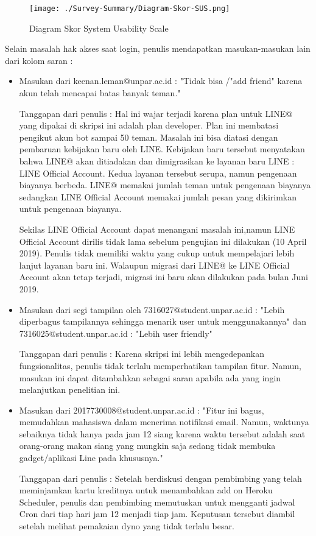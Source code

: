 \begin{figure}[H]
	\centering  
	\texttt{[image: ./Survey-Summary/Diagram-Skor-SUS.png]}
	\caption[Diagram Skor System Usability Scale]{Diagram Skor System Usability Scale} 
	\label{fig:summary-Diagram-Skor-SUS} 
\end{figure}

Selain masalah hak akses saat login, penulis mendapatkan masukan-masukan lain dari kolom saran :
\begin{itemize}
  \item Masukan dari keenan.leman@unpar.ac.id : "Tidak bisa /"add friend" karena akun telah mencapai batas banyak teman."
  
  Tanggapan dari penulis : Hal ini wajar terjadi karena plan untuk LINE@ yang dipakai di skripsi ini adalah plan developer. Plan ini membatasi pengikut akun bot sampai 50 teman. Masalah ini bisa diatasi dengan pembaruan kebijakan baru oleh LINE. Kebijakan baru tersebut menyatakan bahwa LINE@ akan ditiadakan dan dimigrasikan ke layanan baru LINE : LINE Official Account. Kedua layanan tersebut serupa, namun pengenaan biayanya berbeda. LINE@ memakai jumlah teman untuk pengenaan biayanya sedangkan LINE Official Account memakai jumlah pesan yang dikirimkan untuk pengenaan biayanya.

  Sekilas LINE Official Account dapat menangani masalah ini,namun LINE Official Account dirilis tidak lama sebelum pengujian ini dilakukan (10 April 2019). Penulis tidak memiliki waktu yang cukup untuk mempelajari lebih lanjut layanan baru ini. Walaupun migrasi dari LINE@ ke LINE Official Account akan tetap terjadi, migrasi ini baru akan dilakukan pada bulan Juni 2019.

  \item Masukan dari segi tampilan oleh 7316027@student.unpar.ac.id : "Lebih diperbagus tampilannya sehingga menarik user untuk menggunakannya" dan 7316025@student.unpar.ac.id : "Lebih user friendly"
  
  Tanggapan dari penulis : Karena skripsi ini lebih mengedepankan fungsionalitas, penulis tidak terlalu memperhatikan tampilan fitur. Namun, masukan ini dapat ditambahkan sebagai saran apabila ada yang ingin melanjutkan penelitian ini.
  
  \item Masukan dari 2017730008@student.unpar.ac.id : "Fitur ini bagus, memudahkan mahasiswa dalam menerima notifikasi email. Namun, waktunya sebaiknya tidak hanya pada jam 12 siang karena waktu tersebut adalah saat orang-orang makan siang yang mungkin saja sedang tidak membuka gadget/aplikasi Line pada khususnya."
  
  Tanggapan dari penulis : Setelah berdiskusi dengan pembimbing yang telah meminjamkan kartu kreditnya untuk menambahkan add on Heroku Scheduler, penulis dan pembimbing memutuskan untuk mengganti jadwal Cron dari tiap hari jam 12 menjadi tiap jam. Keputusan tersebut diambil setelah melihat pemakaian dyno yang tidak terlalu besar.
\end{itemize}